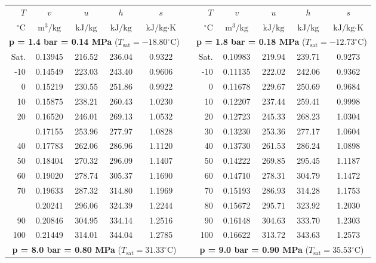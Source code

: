 \documentclass[12pt,a3paper]{article}
\begin{document}
\begin{enumerate}
\begin{center}
\small
\begin{tabular}{r c c c c p{0.2cm} r c c c c}
\toprule\toprule
$T$ & $v$ & $u$ & $h$ & $s$ & & $T$ & $v$ & $u$ & $h$ & $s$ \\
$^\circ\text{C}$ & $\text{m}^3\text{/kg}$ & $\text{kJ/kg}$ & $\text{kJ/kg}$ & $\text{kJ/kg}\cdot\text{K}$ & & $^\circ\text{C}$ & $\text{m}^3\text{/kg}$ & $\text{kJ/kg}$ & $\text{kJ/kg}$ & $\text{kJ/kg}\cdot\text{K}$ \\
\midrule
\multicolumn{5}{c}{\textbf{p = 1.4 bar = 0.14 MPa} ($T_{\text{sat}} = -18.80^\circ\text{C}$)} & & \multicolumn{5}{c}{\textbf{p = 1.8 bar = 0.18 MPa} ($T_{\text{sat}} = -12.73^\circ\text{C}$)} \\
\cmidrule(lr){1-5} \cmidrule(lr){7-11}
Sat. & 0.13945 & 216.52 & 236.04 & 0.9322 & & Sat. & 0.10983 & 219.94 & 239.71 & 0.9273 \\
-10 & 0.14549 & 223.03 & 243.40 & 0.9606 & & -10 & 0.11135 & 222.02 & 242.06 & 0.9362 \\
0 & 0.15219 & 230.55 & 251.86 & 0.9922 & & 0 & 0.11678 & 229.67 & 250.69 & 0.9684 \\
10 & 0.15875 & 238.21 & 260.43 & 1.0230 & & 10 & 0.12207 & 237.44 & 259.41 & 0.9998 \\
20 & 0.16520 & 246.01 & 269.13 & 1.0532 & & 20 & 0.12723 & 245.33 & 268.23 & 1.0304 \\ \addlinespace
30 & 0.17155 & 253.96 & 277.97 & 1.0828 & & 30 & 0.13230 & 253.36 & 277.17 & 1.0604 \\
40 & 0.17783 & 262.06 & 286.96 & 1.1120 & & 40 & 0.13730 & 261.53 & 286.24 & 1.0898 \\
50 & 0.18404 & 270.32 & 296.09 & 1.1407 & & 50 & 0.14222 & 269.85 & 295.45 & 1.1187 \\
60 & 0.19020 & 278.74 & 305.37 & 1.1690 & & 60 & 0.14710 & 278.31 & 304.79 & 1.1472 \\
70 & 0.19633 & 287.32 & 314.80 & 1.1969 & & 70 & 0.15193 & 286.93 & 314.28 & 1.1753 \\ \addlinespace
80 & 0.20241 & 296.06 & 324.39 & 1.2244 & & 80 & 0.15672 & 295.71 & 323.92 & 1.2030 \\
90 & 0.20846 & 304.95 & 334.14 & 1.2516 & & 90 & 0.16148 & 304.63 & 333.70 & 1.2303 \\
100 & 0.21449 & 314.01 & 344.04 & 1.2785 & & 100 & 0.16622 & 313.72 & 343.63 & 1.2573 \\
\midrule[\lightrulewidth]
\multicolumn{5}{c}{\textbf{p = 8.0 bar = 0.80 MPa} ($T_{\text{sat}} = 31.33^\circ\text{C}$)} & & \multicolumn{5}{c}{\textbf{p = 9.0 bar = 0.90 MPa} ($T_{\text{sat}} = 35.53^\circ\text{C}$)} \\

\end{tabular}
\end{center}
\end{enumerate}
\end{document}
